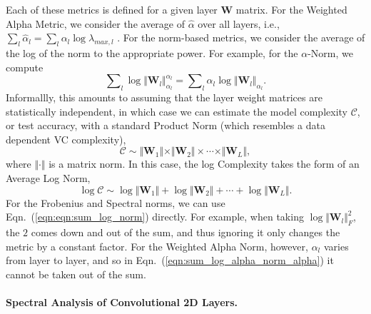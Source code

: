 Each of these metrics is defined for a given layer $\mathbf{W}$ matrix.
For the Weighted Alpha Metric, we consider the average of $\hat{\alpha}$ over all layers, i.e., $\sum_l \hat{\alpha}_l = \sum_l \alpha_l\log\lambda_{max,l} $ .  
For the norm-based metrics, we consider the average of the log of the norm to the appropriate power.
For example, for the $\alpha$-Norm, we compute 
\begin{equation}
\label{eqn:sum_log_alpha_norm_alpha}
\sum\nolimits_l \log \Vert\mathbf{W}_l\Vert_{\alpha_l}^{\alpha_l} 
=
\sum\nolimits_l \alpha_l \log \Vert\mathbf{W}_l\Vert_{\alpha_l} .
\end{equation}
Informallly, this amounts to assuming that the layer weight matrices are statistically independent, in which case we can estimate the model complexity $\mathcal{C}$, or test accuracy, with a standard Product Norm (which resembles a data dependent VC complexity),
\begin{equation}
\mathcal{C}\sim\Vert\mathbf{W}_{1}\Vert\times\Vert\mathbf{W}_{2}\Vert \times \cdots \times \Vert\mathbf{W}_{L}\Vert ,
\end{equation}
where $\Vert\cdot\Vert$ is a matrix norm.   
In this case, the log Complexity takes the form of an Average Log Norm,
\begin{equation}
\label{eqn:eqn:sum_log_norm}
\log\mathcal{C} \sim \log\Vert\mathbf{W}_{1}\Vert+\log\Vert\mathbf{W}_{2}\Vert + \cdots + \log\Vert\mathbf{W}_{L}\Vert  .
\end{equation}
For the Frobenius and Spectral norms, we can use Eqn.~(\ref{eqn:eqn:sum_log_norm}) directly. 
For example, when taking $\log\Vert\mathbf{W}_{l}\Vert_{F}^{2}$, the $2$ comes down and out of the sum, and thus ignoring it only changes the metric by a constant factor.
For the Weighted Alpha Norm, however, $\alpha_l$ varies from layer to layer, and so in Eqn.~(\ref{eqn:sum_log_alpha_norm_alpha}) it cannot be taken out of the sum.


\paragraph{Spectral Analysis of Convolutional 2D Layers.}

